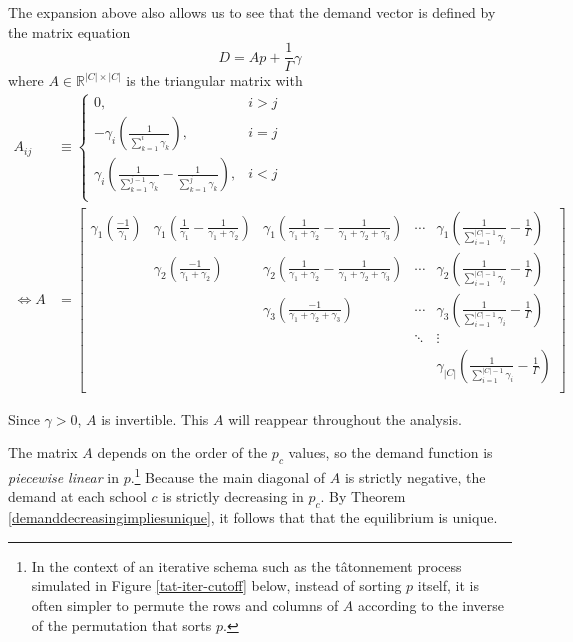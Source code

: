 \documentclass[12pt]{article}
\numberwithin{equation}{subsection}
\theoremstyle{definition}
\begin{document}
The expansion above also allows us to see that the demand vector is defined by the matrix equation
\begin{equation}D = A p + \frac{1}{\Gamma}\gamma \label{demandmatrixeq}\end{equation}
where $A\in \mathbb{R}^{|C| \times |C|}$ is the triangular matrix with
\begin{align} \label{Adef}
A_{ij} &\equiv \begin{cases}
0, & i > j \\
-\gamma_i \left(\frac{1}{ \sum_{k=1}^i \gamma_k}\right), & i=j \\
\gamma_i \left( \frac{1}{\sum_{k=1}^{j-1} \gamma_k} -  \frac{1}{\sum_{k=1}^{j} \gamma_k}\right), & i<j \\
\end{cases} \\[.8em]
\iff A &= \begin{bmatrix}
\gamma_1 \left( \frac{-1}{\gamma_1} \right) & \gamma_1 \left(\frac{1}{\gamma_1} - \frac{1}{\gamma_1 + \gamma_2} \right) & \gamma_1 \left(\frac{1}{\gamma_1 + \gamma_2} - \frac{1}{\gamma_1 + \gamma_2 + \gamma_3} \right) & \cdots &  \gamma_1 \left(\frac{1}{\sum_{i=1}^{|C| - 1}\gamma_i} - \frac{1}{\Gamma}  \right)  \\
 & \gamma_2 \left( \frac{-1}{\gamma_1 + \gamma_2} \right) & \gamma_2 \left(\frac{1}{\gamma_1 + \gamma_2} - \frac{1}{\gamma_1 + \gamma_2 + \gamma_3} \right) & \cdots &  \gamma_2 \left(\frac{1}{\sum_{i=1}^{|C| - 1}\gamma_i} - \frac{1}{\Gamma} \right)  \\
 &  & \gamma_3 \left( \frac{-1}{\gamma_1 + \gamma_2 + \gamma_3} \right) & \cdots &  \gamma_3 \left(\frac{1}{\sum_{i=1}^{|C| - 1}\gamma_i} - \frac{1}{\Gamma} \right)  \\
 & & & \ddots & \vdots \\
 &  &  &  &  \gamma_{|C|} \left(\frac{1}{\sum_{i=1}^{|C| - 1}\gamma_i} -\frac{1}{\Gamma}  \right)  \\
\end{bmatrix}\end{align}

Since $\gamma > 0$, $A$ is invertible. This $A$ will reappear throughout the analysis. 

The matrix $A$ depends on the order of the $p_c$ values, so the demand function is \emph{piecewise linear} in $p$.\footnote{In the context of an iterative schema such as the t\^{a}tonnement process simulated in Figure \ref{tat-iter-cutoff} below, instead of sorting $p$ itself, it is often simpler to permute the rows and columns of $A$ according to the inverse of the permutation that sorts $p$.} Because the main diagonal of $A$ is strictly negative, the demand at each school $c$ is strictly decreasing in $p_c$. By Theorem \ref{demanddecreasingimpliesunique}, it follows that that the equilibrium is unique.
\end{document}
